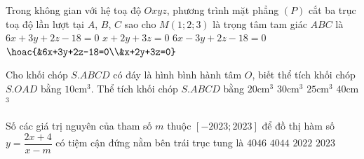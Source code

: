 \begin{ex}%
Trong không gian với hệ toạ độ $Oxyz$, phương trình mặt phẳng $(P)$ cắt ba trục toạ độ lần lượt tại $A$, $B$, $C$ sao cho $M\left(1;2;3\right)$ là trọng tâm tam giác $ABC$ là
\choice
{\True $6x+3y+2z-18=0$}
{$x+2y+3z=0$}
{$6x-3y+2z-18=0$}
{$\hoac{&6x+3y+2z-18=0\\&x+2y+3z=0}$}
\end{ex}
\begin{ex}%
Cho khối chóp $S.ABCD$ có đáy là hình bình hành tâm $O$, biết thể tích khối chóp $S.OAD$ bằng $10$cm$^3$. Thể tích khối chóp $S.ABCD$ bằng
\choice
{$20$cm$^3$}
{$30$cm$^3$}
{$25$cm$^3$}
{\True $40$cm$^3$}
\end{ex}

\begin{ex}%
Số các giá trị nguyên của tham số $m$ thuộc $\left[-2023;2023\right]$ để đồ thị hàm số $y=\dfrac{2x+4}{x-m}$ có tiệm cận đứng nằm bên trái trục tung là
\choice
{$4046$}
{$4044$}
{\True $2022$}
{$2023$}
\end{ex}

